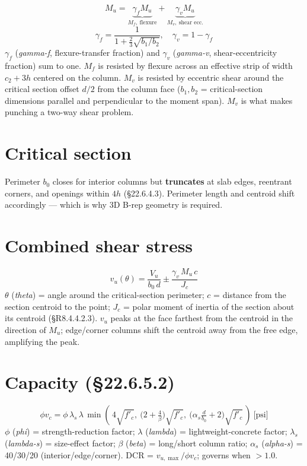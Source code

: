 \documentclass[10pt]{article}
\begin{document}
\vspace{-6pt}
\[
M_u = \underbrace{\gamma_f M_u}_{M_f,\ \text{flexure}} + \underbrace{\gamma_v M_u}_{M_v,\ \text{shear ecc.}}
\]
\vspace{-16pt}
\[
\gamma_f = \frac{1}{1 + \tfrac{2}{3}\sqrt{b_1/b_2}}, \quad \gamma_v = 1 - \gamma_f
\]
$\gamma_f$ (\emph{gamma-f}, flexure-transfer fraction) and $\gamma_v$ (\emph{gamma-v}, shear-eccentricity fraction) sum to one. $M_f$ is resisted by flexure across an effective strip of width $c_2 + 3h$ centered on the column. $M_v$ is resisted by eccentric shear around the critical section offset $d/2$ from the column face ($b_1, b_2$ = critical-section dimensions parallel and perpendicular to the moment span). $M_v$ is what makes punching a two-way shear problem.

\section*{Critical section}
Perimeter $b_0$ closes for interior columns but \textbf{truncates} at slab edges, reentrant corners, and openings within $4h$ (\S22.6.4.3). Perimeter length and centroid shift accordingly --- which is why 3D B-rep geometry is required.

\section*{Combined shear stress}
\vspace{-10pt}
\[
v_u(\theta) = \frac{V_u}{b_0\, d} \pm \frac{\gamma_v\, M_u\, c}{J_c}
\]
$\theta$ (\emph{theta}) = angle around the critical-section perimeter; $c$ = distance from the section centroid to the point; $J_c$ = polar moment of inertia of the section about its centroid (\S R8.4.4.2.3). $v_u$ peaks at the face farthest from the centroid in the direction of $M_u$; edge/corner columns shift the centroid away from the free edge, amplifying the peak.

\section*{Capacity (\S22.6.5.2)}
\vspace{-10pt}
\[
\phi v_c = \phi\, \lambda_s\, \lambda\, \min\!\left(\, 4\sqrt{f'_c},\ \bigl(2+\tfrac{4}{\beta}\bigr)\sqrt{f'_c},\ \bigl(\alpha_s \tfrac{d}{b_0}+2\bigr)\sqrt{f'_c}\,\right) \ \text{[psi]}
\]
$\phi$ (\emph{phi}) = strength-reduction factor; $\lambda$ (\emph{lambda}) = lightweight-concrete factor; $\lambda_s$ (\emph{lambda-s}) = size-effect factor; $\beta$ (\emph{beta}) = long/short column ratio; $\alpha_s$ (\emph{alpha-s}) = 40/30/20 (interior/edge/corner). DCR = $v_{u,\max}/\phi v_c$; governs when $>1.0$.
\end{document}
